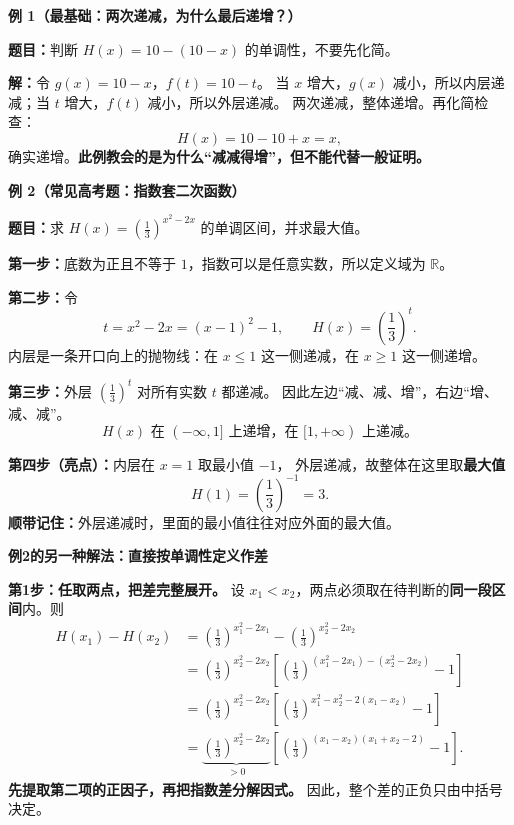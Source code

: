 \clearpage
\begin{examplebox}
\textbf{\textcolor{CExample}{例 1（最基础：两次递减，为什么最后递增？）}}



\textbf{题目：}判断 $H(x)=10-(10-x)$ 的单调性，不要先化简。

\textbf{解：}令 $g(x)=10-x$，$f(t)=10-t$。
当 $x$ 增大，$g(x)$ 减小，所以内层递减；当 $t$ 增大，$f(t)$ 减小，所以外层递减。
两次递减，整体递增。再化简检查：
\[
 H(x)=10-10+x=x,
\]
确实递增。\textbf{此例教会的是为什么“减减得增”，但不能代替一般证明。}

\medskip
\end{examplebox}
\clearpage
\begin{examplebox}
\textbf{\textcolor{CExample}{例 2（常见高考题：指数套二次函数）}}



\textbf{题目：}求 $H(x)=\left(\frac13\right)^{x^2-2x}$ 的单调区间，并求最大值。

\textbf{第一步：}底数为正且不等于 $1$，指数可以是任意实数，所以定义域为 $\mathbb R$。

\textbf{第二步：}令
\[
 t=x^2-2x=(x-1)^2-1,\qquad H(x)=\left(\frac13\right)^t.
\]
内层是一条开口向上的抛物线：在 $x\le1$ 这一侧递减，在 $x\ge1$ 这一侧递增。

\textbf{第三步：}外层 $\left(\frac13\right)^t$ 对所有实数 $t$ 都递减。
因此左边“减、减、增”，右边“增、减、减”。
\[
\boxed{H(x)\text{ 在 }(-\infty,1]\text{ 上递增，在 }[1,+\infty)\text{ 上递减。}}
\]

\textbf{第四步（亮点）：}内层在 $x=1$ 取最小值 $-1$，
外层递减，故整体在这里取\textbf{最大值}
\[
 H(1)=\left(\frac13\right)^{-1}=3.
\]
\textbf{顺带记住：}外层递减时，里面的最小值往往对应外面的最大值。

\end{examplebox}
\clearpage
\begin{examplebox}
\textbf{\textcolor{CExample}{例2的另一种解法：直接按单调性定义作差}}


\textbf{第1步：任取两点，把差完整展开。}
设 $x_1<x_2$，两点必须取在待判断的\textbf{同一段区间}内。则
\[
\begin{aligned}
H(x_1)-H(x_2)
&=\left(\frac13\right)^{x_1^2-2x_1}
 -\left(\frac13\right)^{x_2^2-2x_2}\\[5pt]
&=\left(\frac13\right)^{x_2^2-2x_2}
 \left[\left(\frac13\right)^{(x_1^2-2x_1)-(x_2^2-2x_2)}-1\right]\\[5pt]
&=\left(\frac13\right)^{x_2^2-2x_2}
 \left[\left(\frac13\right)^{x_1^2-x_2^2-2(x_1-x_2)}-1\right]\\[5pt]
&=\underbrace{\left(\frac13\right)^{x_2^2-2x_2}}_{>0}
 \left[\left(\frac13\right)^{(x_1-x_2)(x_1+x_2-2)}-1\right].
\end{aligned}
\]
\textbf{先提取第二项的正因子，再把指数差分解因式。}
因此，整个差的正负只由中括号决定。
\end{examplebox}
